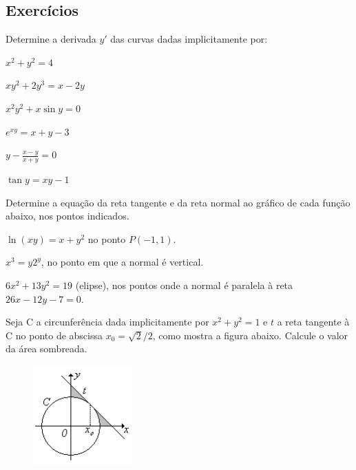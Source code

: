 \cleardoublepage\documentclass[../main.tex]{subfiles}
\begin{document}
\subsection{Exercícios}

\begin{exer}
 Determine a derivada $y'$ das curvas dadas implicitamente por: 
 \begin{multicols}{3}
 \begin{compactenum}[a)]
 \item $x^2+y^2=4$\item $xy^2+2y^3=x-2y$\item $x^2y^2+x\sin y=0$\item $e^{xy}=x+y-3$\item $y-\frac{x-y}{x+y}=0$\item $\tan y=xy-1$
 \end{compactenum}\end{multicols}
\end{exer}
\begin{exer}
Determine a equação da reta tangente e da reta normal ao gráfico de cada função abaixo, nos 
pontos indicados.
 \begin{compactenum}[a)]
 \item $\ln (xy)=x+y^2$ no ponto $P(-1,1)$. 
\item $x^3=y2^y$, no ponto em que a normal é vertical. 
\item $6x^2+ 13y^2= 19$ (elipse), nos pontos onde a normal é paralela à reta $26 x - 12y -7 = 0$. 
 \end{compactenum}
\end{exer}
\begin{exer}
Seja C a circunferência dada implicitamente por $x^2+y^2=1$ e $t$ a reta tangente à C no ponto de 
abscissa $x_0=\sqrt{2}/2$, como mostra a figura abaixo. Calcule o valor da área sombreada. 
\begin{figure}[H]
    \centering
    \includegraphics[scale=1.3]{3-cap_derivadas/fig_deriv/circsomb.png}
\end{figure}
\end{exer}
\end{document}
